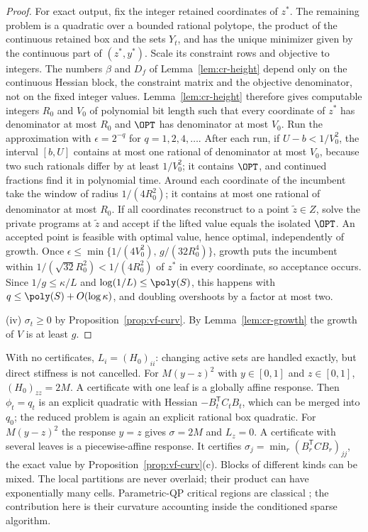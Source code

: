 \begin{proof}
For exact output, fix the integer retained coordinates of $z^*$. The
remaining problem is a quadratic over a bounded rational polytope, the product
of the continuous retained box and the sets $Y_t$, and has the unique
minimizer given by the continuous part of $(z^*,y^*)$. Scale its constraint
rows and objective to integers. The numbers $\beta$ and $D_f$ of
Lemma~\ref{lem:cr-height} depend only on the continuous Hessian block, the
constraint matrix and the objective denominator, not on the fixed integer
values. Lemma~\ref{lem:cr-height} therefore gives computable integers $R_0$
and $V_0$ of polynomial bit length such that every coordinate of $z^*$ has
denominator at most $R_0$ and $\OPT$ has denominator at most $V_0$. Run the
approximation with $\epsilon=2^{-q}$ for $q=1,2,4,\ldots$. After each run, if
$U-b<1/V_0^2$, the interval $[b,U]$ contains at most one rational of
denominator at most $V_0$, because two such rationals differ by at least
$1/V_0^2$; it contains $\OPT$, and continued fractions find it in polynomial
time. Around each coordinate of the incumbent take the window of radius
$1/(4R_0^2)$; it contains at most one rational of denominator at most $R_0$. If
all coordinates reconstruct to a point $\tilde z\in Z$, solve the private
programs at $\tilde z$ and accept if the lifted value equals the isolated
$\OPT$. An accepted point is feasible with optimal value, hence optimal,
independently of growth. Once
$\epsilon\le\min\{1/(4V_0^2),\,g/(32R_0^4)\}$, growth puts the incumbent within
$1/(\sqrt{32}R_0^2)<1/(4R_0^2)$ of $z^*$ in every coordinate, so acceptance
occurs. Since $1/g\le\kappa/L$ and $\log(1/L)\le\poly(S)$, this happens with
$q\le\poly(S)+O(\log\kappa)$, and doubling overshoots by a factor at most two.

(iv) $\sigma_t\ge0$ by Proposition~\ref{prop:vf-curv}. By
Lemma~\ref{lem:cr-growth} the growth of $V$ is at least $g$.
\end{proof}

\begin{remark}\label{rem:cr-instances}
With no certificates, $L_i=(H_0)_{ii}$: changing active sets are handled
exactly, but direct stiffness is not cancelled. For $M(y-z)^2$ with
$y\in[0,1]$ and $z\in[0,1]$, $(H_0)_{zz}=2M$. A certificate with one leaf is
a globally affine response. Then $\phi_t=q_t$ is an explicit quadratic with
Hessian $-B_t^{\mathsf T}C_tB_t$, which can be merged into $q_0$; the reduced
problem is again an explicit rational box quadratic. For $M(y-z)^2$ the
response $y=z$ gives $\sigma=2M$ and $L_z=0$. A certificate with several
leaves is a piecewise-affine response. It certifies
$\sigma_j=\min_r(B_r^{\mathsf T}CB_r)_{jj}$, the exact value by
Proposition~\ref{prop:vf-curv}(c). Blocks of different kinds can be mixed. The
local partitions are never overlaid; their product can have exponentially many
cells. Parametric-QP critical regions are classical
\cite{BemporadEtAl2002}; the contribution here is their curvature accounting
inside the conditioned sparse algorithm.
\end{remark}

